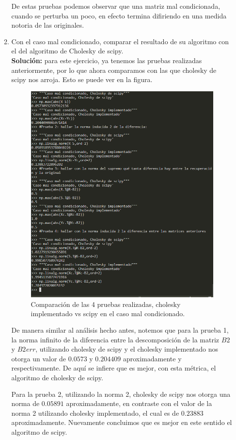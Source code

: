 \documentclass[letterpaper]{article}
\newcommand{\1}{\mathds{1}}
\theoremstyle{definition}
\theoremstyle{definition}
\theoremstyle{definition}
\theoremstyle{definition}
\theoremstyle{definition}
\begin{document}
\begin{enumerate}
\begin{enumerate}
        De estas pruebas podemos observar que una matriz mal condicionada, cuando se perturba un poco, en efecto termina difiriendo
        en una medida notoria de las originales.


        \item Con el caso mal condicionado, comparar el resultado de su algoritmo con el del algoritmo
        de Cholesky de scipy.\\

        \textbf{Solución:} para este ejercicio, ya tenemos las pruebas realizadas anteriormente, por lo que ahora comparamos con 
        las que cholesky de scipy nos arroja. Esto se puede ver en la figura.

        \begin{figure}[h]
            \centering
            \includegraphics[width=0.7\linewidth]{4.png}
            \caption{Comparación de las 4 pruebas realizadas, cholesky implementado vs scipy en el caso mal condicionado.}
        \end{figure}

        De manera similar al análisis hecho antes, notemos que para la prueba 1, la norma infinito de la diferencia entre la descomposición de 
        la matriz $B2$ y $B2_{}err$, utilizando cholesky de scipy y el cholesky implementado nos otorga un valor de $0.0573$ y $0.204409$ aproximadamente
        y respectivamente. De aquí se infiere que es mejor, con esta métrica, el algoritmo de cholesky de scipy.
        \newline

        Para la prueba 2, utilizando la norma 2, cholesky de scipy nos otorga una norma de $0.05891$ aproximadamente, en contraste con 
        el valor de la norma 2 utilizando cholesky implementado, el cual es de $0.23883$ aproximadamente. Nuevamente concluimos que es mejor
        en este sentido el algoritmo de scipy.
        \newline


\end{enumerate}
\end{enumerate}
\end{document}
